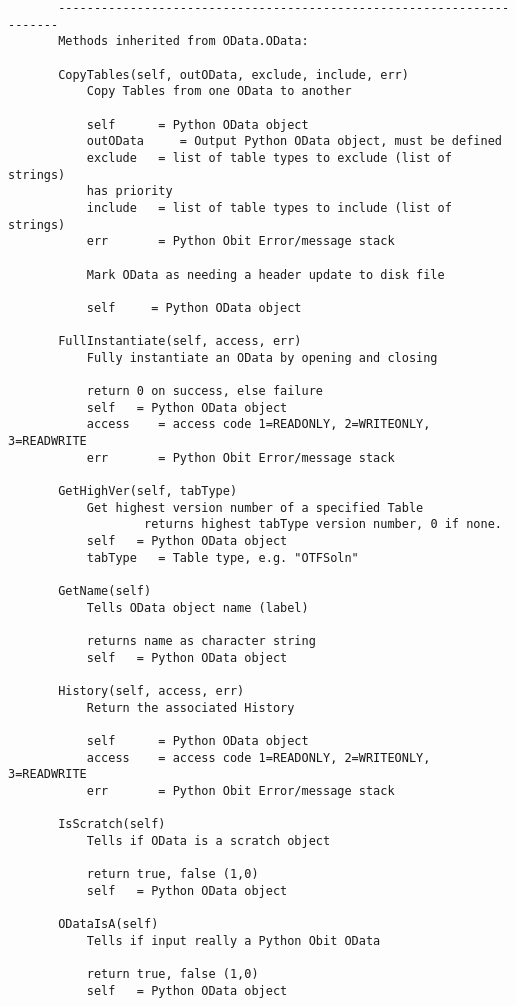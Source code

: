 \documentclass[11pt]{report}
\begin{document}
\begin{verbatim}
       ----------------------------------------------------------------------
       Methods inherited from OData.OData:
       
       CopyTables(self, outOData, exclude, include, err)
           Copy Tables from one OData to another
           
           self      = Python OData object
           outOData     = Output Python OData object, must be defined
           exclude   = list of table types to exclude (list of strings)
           has priority
           include   = list of table types to include (list of strings)
           err       = Python Obit Error/message stack
       
           Mark OData as needing a header update to disk file
           
           self     = Python OData object
       
       FullInstantiate(self, access, err)
           Fully instantiate an OData by opening and closing
           
           return 0 on success, else failure
           self   = Python OData object
           access    = access code 1=READONLY, 2=WRITEONLY, 3=READWRITE
           err       = Python Obit Error/message stack
       
       GetHighVer(self, tabType)
           Get highest version number of a specified Table
                   returns highest tabType version number, 0 if none.
           self   = Python OData object
           tabType   = Table type, e.g. "OTFSoln"
       
       GetName(self)
           Tells OData object name (label)
           
           returns name as character string
           self   = Python OData object
       
       History(self, access, err)
           Return the associated History
           
           self      = Python OData object
           access    = access code 1=READONLY, 2=WRITEONLY, 3=READWRITE
           err       = Python Obit Error/message stack
       
       IsScratch(self)
           Tells if OData is a scratch object
           
           return true, false (1,0)
           self   = Python OData object
       
       ODataIsA(self)
           Tells if input really a Python Obit OData
           
           return true, false (1,0)
           self   = Python OData object
       

\end{verbatim}
\end{document}
